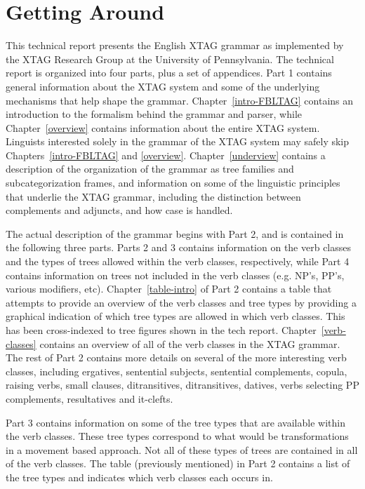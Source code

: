 \chapter{Getting Around}

This technical report presents the English XTAG grammar as implemented by
the XTAG Research Group at the University of Pennsylvania.  The technical
report is organized into four parts, plus a set of appendices.  Part 1
contains general information about the XTAG system and some of the
underlying mechanisms that help shape the grammar.
Chapter~\ref{intro-FBLTAG} contains an introduction to the formalism behind
the grammar and parser, while Chapter~\ref{overview} contains information
about the entire XTAG system.  Linguists interested solely in the grammar
of the XTAG system may safely skip Chapters~\ref{intro-FBLTAG} and
\ref{overview}.  Chapter~\ref{underview} contains a description of the
organization of the grammar as tree families and subcategorization frames, 
and information on some of the linguistic principles that underlie the XTAG
grammar, including the distinction between complements and adjuncts, and
how case is handled.

The actual description of the grammar begins with Part 2, and is contained
in the following three parts.  Parts 2 and 3 contains information on the
verb classes and the types of trees allowed within the verb classes,
respectively, while Part 4 contains information on trees not included in
the verb classes (e.g.  NP's, PP's, various modifiers, etc).
Chapter~\ref{table-intro} of Part 2 contains a table that attempts to
provide an overview of the verb classes and tree types by providing a
graphical indication of which tree types are allowed in which verb classes.
This has been cross-indexed to tree figures shown in the tech report.
Chapter~\ref{verb-classes} contains an overview of all of the verb classes
in the XTAG grammar.  The rest of Part 2 contains more details on several
of the more interesting verb classes, including ergatives, sentential
subjects, sentential complements, copula, raising verbs, small clauses,
ditransitives, ditransitives, datives, verbs selecting PP complements,
resultatives and it-clefts.

Part 3 contains information on some of the tree types that are available within
the verb classes.  These tree types correspond to what would be transformations
in a movement based approach.  Not all of these types of trees are contained in
all of the verb classes.  The table (previously mentioned) in Part 2 contains a
list of the tree types and indicates which verb classes each occurs in.  

